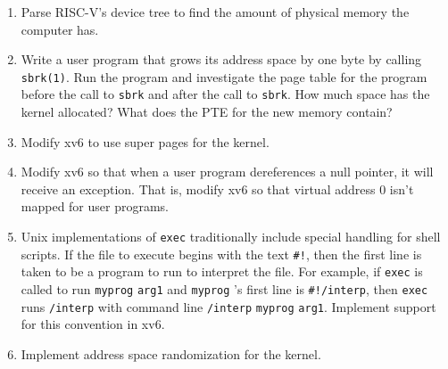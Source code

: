\begin{enumerate}
  
\item Parse RISC-V's device tree to find the amount of physical memory
the computer has.

\item Write a user program that grows its address space by one byte by calling
\lstinline{sbrk(1)}.
Run the  program and investigate the page table for the program before the call
to
\lstinline{sbrk}
and after the call to
\lstinline{sbrk}.
How much space has the kernel allocated?  What does the
PTE
for the new memory contain?

\item Modify xv6 to use super pages for the kernel.

\item Modify xv6 so that when a user program dereferences a null pointer, it will
receive an exception.  That is, modify xv6 so that virtual address 0 isn't mapped for
user programs.

\item Unix implementations of
\lstinline{exec}
traditionally include special handling for shell scripts.
If the file to execute begins with the text
\lstinline{#!},
then the first line is taken to be a program
to run to interpret the file.
For example, if
\lstinline{exec}
is called to run
\lstinline{myprog}
\lstinline{arg1}
and
\lstinline{myprog} 's
first line is
\lstinline{#!/interp},
then
\lstinline{exec}
runs
\lstinline{/interp}
with command line
\lstinline{/interp}
\lstinline{myprog}
\lstinline{arg1}.
Implement support for this convention in xv6.

\item Implement address space randomization for the kernel.

\end{enumerate}

